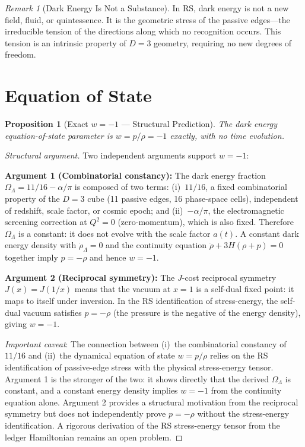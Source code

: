 \documentclass[12pt,a4paper]{article}
\newtheorem{proposition}[theorem]{Proposition}
\theoremstyle{definition}
\theoremstyle{remark}
\newtheorem{remark}[theorem]{Remark}
\begin{document}
\begin{remark}[Dark Energy Is Not a Substance]
In RS, dark energy is not a new field, fluid, or quintessence.
It is the geometric stress of the passive edges---the irreducible
tension of the directions along which no recognition occurs.
This tension is an intrinsic property of $D = 3$ geometry,
requiring no new degrees of freedom.
\end{remark}

\section{Equation of State}
\label{sec:eos}

\begin{proposition}[Exact $w = -1$ --- Structural Prediction]
\label{thm:eos}
The dark energy equation-of-state parameter is
$w = p/\rho = -1$ exactly, with no time evolution.
\end{proposition}

\begin{proof}[Structural argument]
Two independent arguments support $w = -1$:

\textbf{Argument 1 (Combinatorial constancy):}
The dark energy fraction $\Omega_\Lambda = 11/16 - \alpha/\pi$ is
composed of two terms: (i)~$11/16$, a fixed combinatorial property
of the $D = 3$ cube (11 passive edges, 16 phase-space cells),
independent of redshift, scale factor, or cosmic epoch; and
(ii)~$-\alpha/\pi$, the electromagnetic screening correction at
$Q^2 = 0$ (zero-momentum), which is also fixed.  Therefore
$\Omega_\Lambda$ is a constant: it does not evolve with the
scale factor $a(t)$.  A constant dark energy density with
$\dot{\rho}_\Lambda = 0$ and the continuity equation
$\dot{\rho} + 3H(\rho + p) = 0$ together imply $p = -\rho$
and hence $w = -1$.

\textbf{Argument 2 (Reciprocal symmetry):}
The $J$-cost reciprocal symmetry $J(x) = J(1/x)$ means that the
vacuum at $x = 1$ is a self-dual fixed point: it maps to itself
under inversion.  In the RS identification of stress-energy, the
self-dual vacuum satisfies $p = -\rho$ (the pressure is the
negative of the energy density), giving $w = -1$.

\emph{Important caveat}: The connection between (i)~the combinatorial
constancy of $11/16$ and (ii)~the dynamical equation of state
$w = p/\rho$ relies on the RS identification of passive-edge stress
with the physical stress-energy tensor.  Argument 1 is the stronger
of the two: it shows directly that the derived $\Omega_\Lambda$ is
constant, and a constant energy density implies $w = -1$ from the
continuity equation alone.  Argument 2 provides a structural
motivation from the reciprocal symmetry but does not independently
prove $p = -\rho$ without the stress-energy identification.
A rigorous derivation of the RS stress-energy tensor from the
ledger Hamiltonian remains an open problem.
\end{proof}
\end{document}

